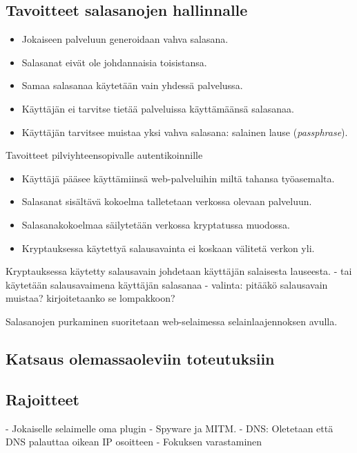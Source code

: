 \documentclass{tktltiki}
\begin{document}
\subsection{Tavoitteet salasanojen hallinnalle}

\begin{itemize}

  \item{Jokaiseen palveluun generoidaan vahva salasana.}
  \item{Salasanat eivät ole johdannaisia toisistansa.}
  \item{Samaa salasanaa käytetään vain yhdessä palvelussa.}
  \item{Käyttäjän ei tarvitse tietää palveluissa käyttämäänsä salasanaa.}
  \item{Käyttäjän tarvitsee muistaa yksi vahva salasana: salainen lause  (\emph{passphrase}).}

\end{itemize}

Tavoitteet pilviyhteensopivalle autentikoinnille

\begin{itemize}

  \item{Käyttäjä pääsee käyttämiinsä web-palveluihin miltä tahansa työasemalta.}
  \item{Salasanat sisältävä kokoelma talletetaan verkossa olevaan palveluun.}
  \item{Salasanakokoelmaa säilytetään verkossa kryptatussa muodossa.}
  \item{Kryptauksessa käytettyä salausavainta ei koskaan välitetä verkon yli.}

\end{itemize}

Kryptauksessa käytetty salausavain johdetaan käyttäjän salaisesta lauseesta.
- tai käytetään salausavaimena käyttäjän salasanaa
- valinta: pitääkö salausavain muistaa? kirjoitetaanko se lompakkoon?

Salasanojen purkaminen suoritetaan web-selaimessa selainlaajennoksen avulla.



\subsection{Katsaus olemassaoleviin toteutuksiin}
\subsection{}
\subsection{Rajoitteet}
 - Jokaiselle selaimelle oma plugin
 - Spyware ja MITM. 
 - DNS: Oletetaan että DNS palauttaa oikean IP osoitteen
 - Fokuksen varastaminen
 
\end{document}
